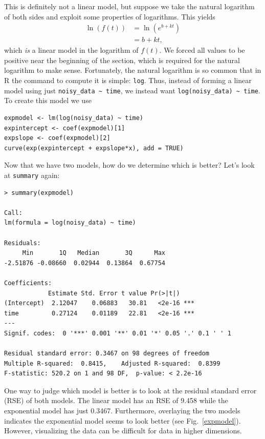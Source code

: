\documentclass[12pt]{article}
\theoremstyle{remark}
\begin{document}
This is definitely not a linear model, but suppose we take the natural logarithm of both sides and exploit some properties of logarithms. This yields
\begin{align*}
	\ln(f(t)) &= \ln(e^{b + kt}) \\
	&= b + kt,
\end{align*}
which \emph{is} a linear model in the logarithm of $f(t)$. We forced all values to be positive near the beginning of the section, which is required for the natural logarithm to make sense. Fortunately, the natural logarithm is so common that in R the command to compute it is simple: \verb|log|. Thus, instead of forming a linear model using just \verb|noisy_data ~ time|, we instead want \verb|log(noisy_data) ~ time|. To create this model we use

\begin{Verbatim}[frame=single, fontsize=\small]
expmodel <- lm(log(noisy_data) ~ time)
expintercept <- coef(expmodel)[1]
expslope <- coef(expmodel)[2]
curve(exp(expintercept + expslope*x), add = TRUE)
\end{Verbatim}

Now that we have two models, how do we determine which is better? Let's look at \verb|summary| again:

\begin{Verbatim}[frame=single, fontsize=\small]
> summary(expmodel)

Call:
lm(formula = log(noisy_data) ~ time)

Residuals:
     Min       1Q   Median       3Q      Max 
-2.51876 -0.08660  0.02944  0.13864  0.67754 

Coefficients:
            Estimate Std. Error t value Pr(>|t|)    
(Intercept)  2.12047    0.06883   30.81   <2e-16 ***
time         0.27124    0.01189   22.81   <2e-16 ***
---
Signif. codes:  0 '***' 0.001 '**' 0.01 '*' 0.05 '.' 0.1 ' ' 1

Residual standard error: 0.3467 on 98 degrees of freedom
Multiple R-squared:  0.8415,	Adjusted R-squared:  0.8399 
F-statistic: 520.2 on 1 and 98 DF,  p-value: < 2.2e-16
\end{Verbatim}

One way to judge which model is better is to look at the residual standard error (RSE) of both models. The linear model has an RSE of 9.458 while the exponential model has just 0.3467. Furthermore, overlaying the two models indicates the exponential model seems to look better (see Fig.~\ref{expmodel}). However, visualizing the data can be difficult for data in higher dimensions.
\end{document}

